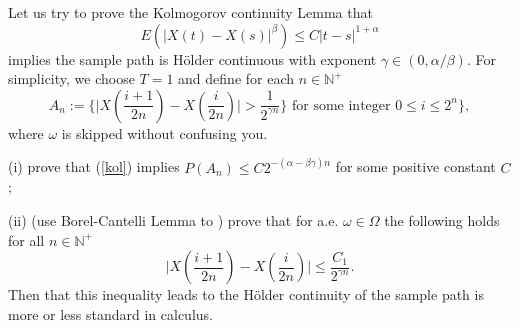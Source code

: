     \problem
    \begin{question}
        Let us try to prove the Kolmogorov continuity Lemma that
        \begin{equation}\label{kol}
        E(|X(t)-X(s)|^\beta)\leq C|t-s|^{1+\alpha}
        \end{equation}
        implies the sample path is H\"older continuous with exponent
        $\gamma\in(0,\alpha/\beta)$.  For simplicity, we choose $T=1$
        and define for each $n\in\mathbb N^+$
        \[A_n:=\Big\{\big|X(\frac{i+1}{2n})-X(\frac{i}{2n})\big|>\frac{1}{2^{\gamma n}}\Big\}
        \text{~for some integer~} 0\leq i\leq 2^n\},\]
        where $\omega$ is skipped without confusing you.

        \noindent(i) prove that (\ref{kol}) implies $P(A_n)\leq C2^{-(\alpha-\beta\gamma)n}$ for some positive constant $C$;

        \noindent(ii) (use Borel-Cantelli Lemma to ) prove that for a.e. $\omega\in\Omega$ the following holds for all $n\in\mathbb N^+$
        \[\Big|X(\frac{i+1}{2n})-X(\frac{i}{2n})\Big|\leq \frac{C_1}{2^{\gamma n}}.\]
        Then that this inequality leads to the H\"older continuity of the sample path is more or less standard in calculus.
    \end{question}
    \newcommand{\absdelta}{\left|X\left(\frac{i+1}{2^n}\right)-X\left(\frac{i}{2^n}\right)\right|}
